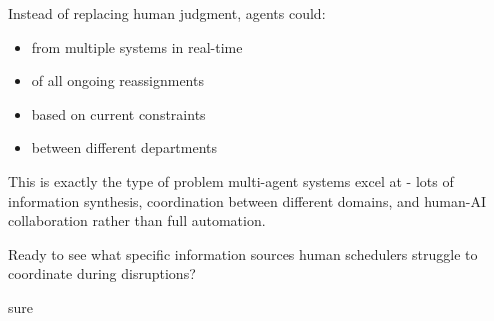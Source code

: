  Instead of replacing human judgment, agents could:

\begin{itemize}
\item {} from multiple systems in real-time
\end{itemize}
\begin{itemize}
\item {} of all ongoing reassignments
\end{itemize}
\begin{itemize}
\item {} based on current constraints
\end{itemize}
\begin{itemize}
\item {} between different departments
\end{itemize}

This is exactly the type of problem multi-agent systems excel at - lots of information synthesis, coordination between different domains, and human-AI collaboration rather than full automation.

Ready to see what specific information sources human schedulers struggle to coordinate during disruptions?


sure


